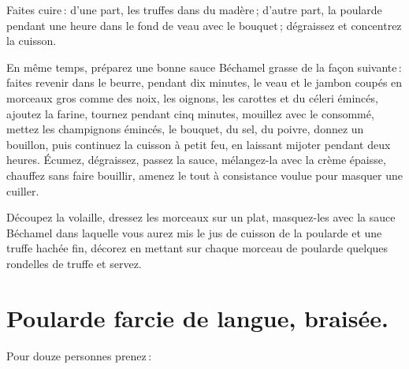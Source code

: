Faites cuire : d’une part, les truffes dans du madère ; d'autre part, la
poularde pendant une heure dans le fond de veau avec le bouquet ; dégraissez et
concentrez la cuisson.

\label{pg0566} \hypertarget{p0566}{}
En même temps, préparez une bonne sauce Béchamel grasse de la façon suivante :
faites revenir dans le beurre, pendant dix minutes, le veau et le jambon coupés
en morceaux gros comme des noix, les oignons, les carottes et du céleri
émincés, ajoutez la farine, tournez pendant cinq minutes, mouillez avec le
consommé, mettez les champignons émincés, le bouquet, du sel, du poivre, donnez
un bouillon, puis continuez la cuisson à petit feu, en laissant mijoter pendant
deux heures. Écumez, dégraissez, passez la sauce, mélangez-la avec la crème
épaisse, chauffez sans faire bouillir, amenez le tout à consistance voulue pour
masquer une cuiller.

Découpez la volaille, dressez les morceaux sur un plat, masquez-les avec la
sauce Béchamel dans laquelle vous aurez mis le jus de cuisson de la poularde et
une truffe hachée fin, décorez en mettant sur chaque morceau de poularde
quelques rondelles de truffe et servez.

\section*{\centering Poularde farcie de langue, braisée.}
{}
Pour douze personnes prenez :

\medskip

